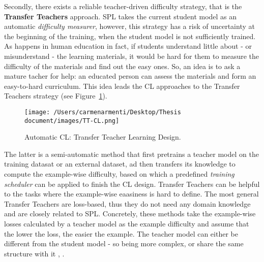 Secondly, there exists a reliable teacher-driven difficulty strategy, that is the \textbf{Transfer Teachers} approach.
SPL takes the current student model as an automatic \textit{difficulty measurer}, however, this strategy has a risk of uncertainty at the beginning of the training, when the student model
is not sufficiently trained. As happens in human education in fact, if students understand 
little about - or misunderstand - the learning materials, it would be hard for them to measure the difficulty of the materials 
and find out the easy ones. So, an idea is to ask a mature tacher for help: an educated person can assess
the materials and form an easy-to-hard curriculum. This idea leads the CL approaches to the Transfer Teachers strategy (see Figure~\ref{fig:TT-CL}).
\begin{figure}[h]
    \begin{center}
        \texttt{[image: /Users/carmenarmenti/Desktop/Thesis document/images/TT-CL.png]}
        \caption{\label{fig:TT-CL}Automatic CL: Transfer Teacher Learning Design.}
    \end{center}
\end{figure}
The latter is a semi-automatic method that first pretrains a teacher model on the training datasat or an external dataset, ad then transfers its knowledge
to compute the example-wise difficulty, based on which a predefined \textit{training scheduler} can be applied to finish the CL design. 
Transfer Teachers can be helpful to the tasks where the example-wise eaasiness is hard to define.
The most general Transfer Teachers are loss-based, thus they do not need any domain knowledge and are closely related 
to SPL. Concretely, these methods take the example-wise losses calculated by a teacher model as the example difficulty 
and assume that the lower the loss, the easier the example. The teacher model can either be different 
from the student model \cite{weinshall2018curriculum} - so being more complex, or share the same structure with it \cite{hacohen2019power}, \cite{xu2020curriculum}.


